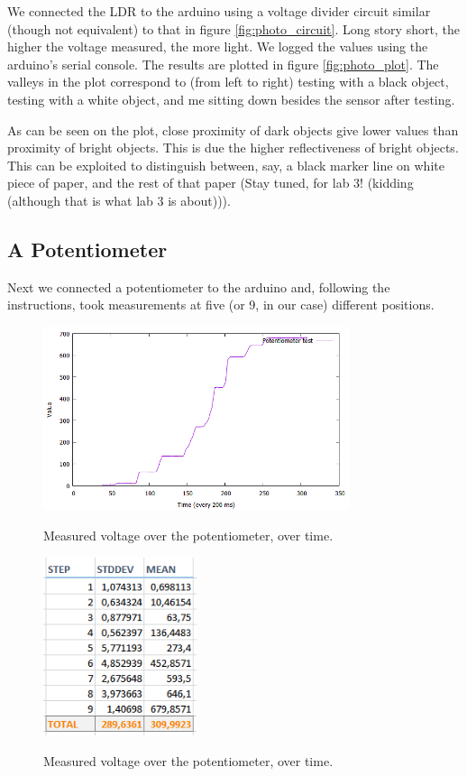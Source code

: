 \documentclass[a4paper, titlepage]{report}
\renewcommand{\%}{\scalebox{.9}{\oldpct}}
\begin{document}
We connected the LDR to the arduino using a voltage divider circuit similar
(though not equivalent) to that in figure \ref{fig:photo_circuit}. Long story
short, the higher the voltage measured, the more light. We logged the values
using the arduino's serial console. The results are plotted in figure
\ref{fig:photo_plot}. The valleys in the plot correspond to (from left to right)
testing with a black object, testing with a white object, and me sitting down
besides the sensor after testing.

As can be seen on the plot, close proximity of dark objects give lower values
than proximity of bright objects. This is due the higher reflectiveness
of bright objects. This can be exploited to distinguish between, say, a black
marker line on white piece of paper, and the rest of that paper (Stay tuned, for
lab 3! (kidding (although that is what lab 3 is about))).

\subsection*{A Potentiometer}
Next we connected a potentiometer to the arduino and, following the
instructions, took measurements at five (or 9, in our case) different positions.

\begin{figure}[htbp]
\centering
\includegraphics[width=0.8\textwidth]{imgs/Potentiometer/result_pot.png}
\label{fig:pot_plot}
\caption{Measured voltage over the potentiometer, over time.}
\end{figure}

\begin{figure}[htbp]
\centering
\includegraphics[width=0.4\textwidth]{imgs/Potentiometer/excel_dev.PNG}
\label{fig:fig:stats}
\caption{Measured voltage over the potentiometer, over time.}
\end{figure}
\end{document}
